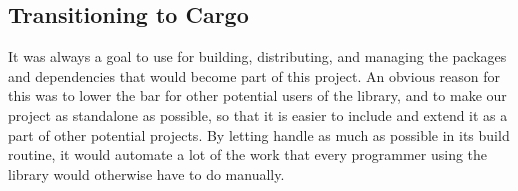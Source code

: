 


\subsection{Transitioning to Cargo}
\label{ssub:transitioning_to_cargo}

It was always a goal to use {\cargo} for building, distributing, and managing the packages and dependencies that would become part of this project.
An obvious reason for this was to lower the bar for other potential users of the library, and to make our project as standalone as possible, so that it is easier to include and extend it as a part of other potential projects.
By letting {\cargo} handle as much as possible in its build routine, it would automate a lot of the work that every programmer using the library would otherwise have to do manually.

